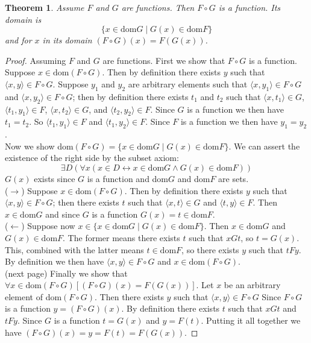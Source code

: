 \documentclass{report}
\newtheorem{theorem}[theo]{Theorem}
\begin{document}
\begin{theorem}\label{theorems2}
Assume $F$ and $G$ are functions. Then $F\circ G$ is a function. Its domain is
\begin{equation*}
\{x\in\text{dom}G\mid G(x)\in\text{dom}F\}
\end{equation*}
and for $x$ in its domain $(F\circ G)(x)=F(G(x))$.
\end{theorem}
\begin{proof}
Assuming $F$ and $G$ are functions. First we show that $F\circ G$ is a function.
Suppose $x\in\text{dom}(F\circ G)$. Then by definition there exists $y$ such that $\langle x,y\rangle\in F\circ G$. Suppose $y_1$ and $y_2$ are arbitrary elements such that
$\langle x,y_1\rangle\in F\circ G$ and $\langle x,y_2\rangle\in F\circ G$; then by definition there exists $t_1$ and $t_2$ such that $\langle x,t_1\rangle\in G$,
$\langle t_1,y_1\rangle\in F$, $\langle x,t_2\rangle\in G$, and $\langle t_2,y_2\rangle\in F$.
Since $G$ is a function we then have $t_1=t_2$. So 
$\langle t_1,y_1\rangle\in F$ and $\langle t_1,y_2\rangle\in F$. Since $F$ is a function we then have $y_1=y_2$.\\
\indent Now we show dom$(F\circ G)=\{x\in\text{dom}G\mid G(x)\in\text{dom}F\}$. We can assert the existence of the right side by the subset axiom:
\begin{equation*}
\exists D(\forall x(x\in D\leftrightarrow x\in\text{dom}G\land G(x)\in\text{dom}F))
\end{equation*}
$G(x)$ exists since $G$ is a function and dom$G$ and dom$F$ are sets.\\
\indent($\rightarrow$) Suppose $x\in\text{dom}(F\circ G)$. Then by definition there exists $y$ such that $\langle x,y\rangle\in F\circ G$; then there exists $t$ such that $\langle x,t\rangle\in G$
and $\langle t,y\rangle\in F$. Then $x\in\text{dom}G$ and since $G$ is a function $G(x)=t\in\text{dom}F$.\\
\indent($\leftarrow$) Suppose now $x\in\{x\in\text{dom}G\mid G(x)\in\text{dom}F\}$. Then $x\in\text{dom}G$ and $G(x)\in\text{dom}F$. The former means there exists $t$ such that $xGt$, so $t=G(x)$.
This, combined with the latter means $t\in\text{dom}F$, so there exists $y$ such that $tFy$.
By definition we then have $\langle x,y\rangle\in F\circ G$ and $x\in\text{dom}(F\circ G)$.\\
(next page)\newpage
Finally we show that $\forall x\in\text{dom}(F\circ G)[(F\circ G)(x)=F(G(x))]$. Let $x$ be an arbitrary element of dom$(F\circ G)$. Then there exists $y$ such that $\langle x,y\rangle\in F\circ G$
Since $F\circ G$ is a function $y=(F\circ G)(x)$. By definition there exists $t$ such that
$xGt$ and $tFy$. Since $G$ is a function $t=G(x)$ and $y=F(t)$.
Putting it all together we have $(F\circ G)(x)=y=F(t)=F(G(x))$.
\end{proof}
\end{document}
